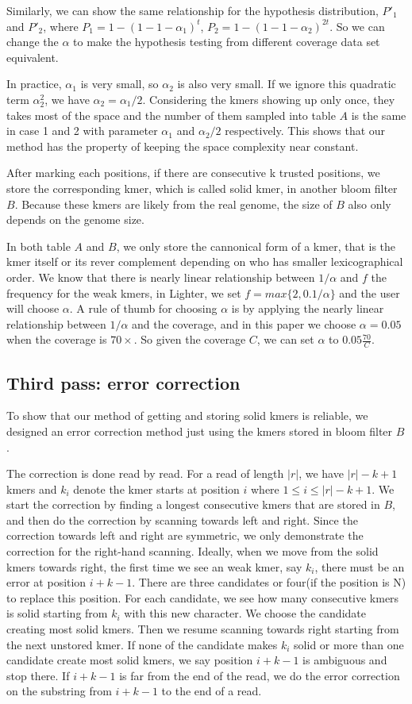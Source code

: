 \documentclass[10pt]{article}
\begin{document}
Similarly, we can show the same relationship for the hypothesis distribution, $P'_1$ and $P'_2$, where $P_1=1-(1-1-\alpha_1)^t$, $P_2=1-(1-1-\alpha_2)^{2t}$. So we can change the $\alpha$ to make the hypothesis testing from different coverage data set equivalent.

In practice, $\alpha_1$ is very small, so $\alpha_2$ is also very small. If we ignore this quadratic term $\alpha_2^2$, we have $\alpha_2=\alpha_1 / 2$. Considering the kmers showing up only once, they takes most of the space and the number of them sampled into table $A$ is the same in case 1 and 2 with parameter $\alpha_1$ and $\alpha_2/2$ respectively. This shows that our method has the property of keeping the space complexity near constant. 

After marking each positions, if there are consecutive k trusted positions, we store the corresponding kmer, which is called solid kmer, in another bloom filter $B$. Because these kmers are likely from the real genome, the size of $B$ also only depends on the genome size. 

In both table $A$ and $B$, we only store the cannonical form of a kmer, that is the kmer itself or its rever complement depending on who has smaller lexicographical order. We know that there is nearly linear relationship between $1/\alpha$ and $f$ the frequency for the weak kmers, in Lighter, we set $f=max\{2,0.1/\alpha\}$ and the user will choose $\alpha$. A rule of thumb for choosing $\alpha$ is by applying the nearly linear relationship between $1/\alpha$ and the coverage, and in this paper we choose $\alpha=0.05$ when the coverage is $70\times$. So given the coverage $C$, we can set $\alpha$ to $0.05\frac{70}{C}$. 

\subsection*{Third pass: error correction}
To show that our method of getting and storing solid kmers is reliable, we designed an error correction method just using the kmers stored in bloom filter $B$.

The correction is done read by read. For a read of length $|r|$, we have $|r|-k+1$ kmers and $k_i$ denote the kmer starts at position $i$ where $1\le i\le|r|-k+1$. We start the correction by finding a longest consecutive kmers that are stored in $B$, and then do the correction by scanning towards left and right. Since the correction towards left and right are symmetric, we only demonstrate the correction for the right-hand scanning. Ideally, when we move from the solid kmers towards right, the first time we see an weak kmer, say $k_i$, there must be an error at position $i+k-1$. There are three candidates or four(if the position is N) to replace this position. For each candidate, we see how many consecutive kmers is solid starting from $k_i$ with this new character. We choose the candidate creating most solid kmers. Then we resume scanning towards right starting from the next unstored kmer. If none of the candidate makes $k_i$ solid or more than one candidate create most solid kmers, we say position $i+k-1$ is ambiguous and stop there. If $i+k-1$ is far from the end of the read, we do the error correction on the substring from $i+k-1$ to the end of a read.
\end{document}
